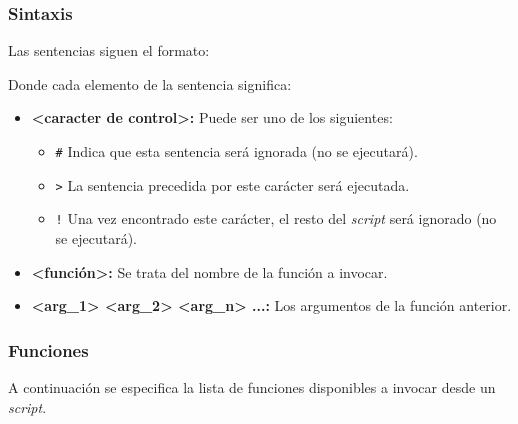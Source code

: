 \subsubsection{Sintaxis}

Las sentencias siguen el formato:


Donde cada elemento de la sentencia significa:
\begin{itemize}
\item \textbf{<caracter de control>:} Puede ser uno de los siguientes:
  \begin{itemize}
  \item \texttt{\#} Indica que esta sentencia será ignorada (no se ejecutará).
  \item \texttt{>} La sentencia precedida por este carácter será ejecutada.
  \item \texttt{!} Una vez encontrado este carácter, el resto del \textit{script} será ignorado
    (no se ejecutará).
  \end{itemize}
\item \textbf{<función>:} Se trata del nombre de la función a invocar.
\item \textbf{<arg\_1> <arg\_2> <arg\_n> ...:} Los argumentos de la función anterior.
\end{itemize}

\subsubsection{Funciones}

A continuación se especifica la lista de funciones disponibles a invocar desde un \textit{script}.

